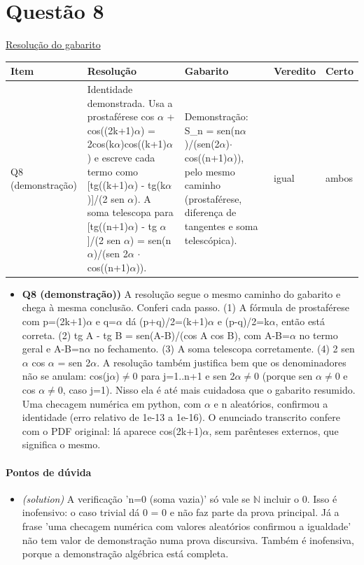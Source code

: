 \documentclass{article}%
\begin{document}
\section*{Questão 8}%
\href{https://poliedroresolve.sistemapoliedro.com.br/vestibulares/ime/2027/ime-2-fase-dia-1-26-10-2026-2-fase-dia-1/dissertativa-8-matematica-2-fase-dia-1-ime-2027}{Resolução do gabarito}\par\smallskip%
\begin{longtable}{@{}p{} p{} p{} p{} p{}@{}}\toprule Item & Resolução & Gabarito & Veredito & Certo \\ \midrule
Q8 (demonstração) & Identidade demonstrada. Usa a prostaférese cos $\alpha$ + cos((2k+1)$\alpha$) = 2cos(k$\alpha$)cos((k+1)$\alpha$) e escreve cada termo como {[}tg((k+1)$\alpha$) - tg(k$\alpha$){]}/(2 sen $\alpha$). A soma telescopa para {[}tg((n+1)$\alpha$) - tg $\alpha${]}/(2 sen $\alpha$) = sen(n$\alpha$)/(sen 2$\alpha$ $\cdot$ cos((n+1)$\alpha$)). & Demonstração: S\_n = sen(n$\alpha$)/(sen(2$\alpha$)$\cdot$cos((n+1)$\alpha$)), pelo mesmo caminho (prostaférese, diferença de tangentes e soma telescópica). & igual & ambos \\
\bottomrule\end{longtable}%
\begin{itemize}%
\item%
\textbf{Q8 (demonstração))} A resolução segue o mesmo caminho do gabarito e chega à mesma conclusão. Conferi cada passo. (1) A fórmula de prostaférese com p=(2k+1)$\alpha$ e q=$\alpha$ dá (p+q)/2=(k+1)$\alpha$ e (p-q)/2=k$\alpha$, então está correta. (2) tg A - tg B = sen(A-B)/(cos A cos B), com A-B=$\alpha$ no termo geral e A-B=n$\alpha$ no fechamento. (3) A soma telescopa corretamente. (4) 2 sen $\alpha$ cos $\alpha$ = sen 2$\alpha$. A resolução também justifica bem que os denominadores não se anulam: cos(j$\alpha$)$\neq$0 para j=1..n+1 e sen 2$\alpha$$\neq$0 (porque sen $\alpha$$\neq$0 e cos $\alpha$$\neq$0, caso j=1). Nisso ela é até mais cuidadosa que o gabarito resumido. Uma checagem numérica em python, com $\alpha$ e n aleatórios, confirmou a identidade (erro relativo de 1e{-}13 a 1e{-}16). O enunciado transcrito confere com o PDF original: lá aparece cos(2k+1)$\alpha$, sem parênteses externos, que significa o mesmo.%
\end{itemize}%
\paragraph{Pontos de dúvida}%
\begin{itemize}%
\item%
\textit{(solution)} A verificação 'n=0 (soma vazia)' só vale se $\mathbb{N}$ incluir o 0. Isso é inofensivo: o caso trivial dá 0 = 0 e não faz parte da prova principal. Já a frase 'uma checagem numérica com valores aleatórios confirmou a igualdade' não tem valor de demonstração numa prova discursiva. Também é inofensiva, porque a demonstração algébrica está completa.%
\end{itemize}%
\end{document}
